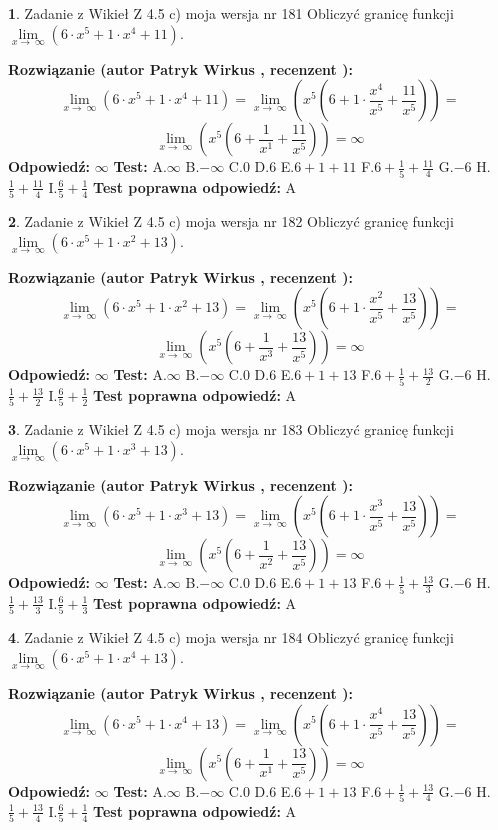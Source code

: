 \documentclass[12pt, a4paper]{article}
\theoremstyle{definition} %
\newtheorem{zad}{}
\newcommand{\zadStart}[1]{\begin{zad}#1\newline}
\newcommand{\zadStop}{\end{zad}}
\newcommand{\rozwStart}[2]{\noindent \textbf{Rozwiązanie (autor #1 , recenzent #2): }\newline}
\newcommand{\rozwStop}{\newline}
\newcommand{\odpStart}{\noindent \textbf{Odpowiedź:}\newline}
\newcommand{\odpStop}{\newline}
\newcommand{\testStart}{\noindent \textbf{Test:}\newline}
\newcommand{\testStop}{\newline}
\newcommand{\kluczStart}{\noindent \textbf{Test poprawna odpowiedź:}\newline}
\newcommand{\kluczStop}{\newline}
\begin{document}
\zadStart{Zadanie z Wikieł Z 4.5 c) moja wersja nr 181}
Obliczyć granicę funkcji  $\lim\limits_{x\to\ \infty}(6 \cdot x^{5}+1 \cdot x^{4}+11)$.
\zadStop
\rozwStart{Patryk Wirkus}{}
$$\lim\limits_{x\to\ \infty}(6 \cdot x^{5}+1 \cdot x^{4}+11) = \lim\limits_{x\to\ \infty}(x^{5}(6 +1 \cdot \frac{x^{4}}{x^{5}}+\frac{11}{x^{5}})) =$$ $$\lim\limits_{x\to\ \infty}(x^{5}(6 +\frac{1}{x^{1}}+\frac{11}{x^{5}})) =\infty$$
\rozwStop
\odpStart
$\infty$
\odpStop
\testStart
A.$\infty$ B.$-\infty$ C.$0$ D.$6$ E.$6 + 1 + 11$
F.$6+\frac{1}{5}+\frac{11}{4}$ G.$-6$
H.$\frac{1}{5}+\frac{11}{4}$
I.$\frac{6}{5}+\frac{1}{4}$
\testStop
\kluczStart
A
\kluczStop



\zadStart{Zadanie z Wikieł Z 4.5 c) moja wersja nr 182}
Obliczyć granicę funkcji  $\lim\limits_{x\to\ \infty}(6 \cdot x^{5}+1 \cdot x^{2}+13)$.
\zadStop
\rozwStart{Patryk Wirkus}{}
$$\lim\limits_{x\to\ \infty}(6 \cdot x^{5}+1 \cdot x^{2}+13) = \lim\limits_{x\to\ \infty}(x^{5}(6 +1 \cdot \frac{x^{2}}{x^{5}}+\frac{13}{x^{5}})) =$$ $$\lim\limits_{x\to\ \infty}(x^{5}(6 +\frac{1}{x^{3}}+\frac{13}{x^{5}})) =\infty$$
\rozwStop
\odpStart
$\infty$
\odpStop
\testStart
A.$\infty$ B.$-\infty$ C.$0$ D.$6$ E.$6 + 1 + 13$
F.$6+\frac{1}{5}+\frac{13}{2}$ G.$-6$
H.$\frac{1}{5}+\frac{13}{2}$
I.$\frac{6}{5}+\frac{1}{2}$
\testStop
\kluczStart
A
\kluczStop



\zadStart{Zadanie z Wikieł Z 4.5 c) moja wersja nr 183}
Obliczyć granicę funkcji  $\lim\limits_{x\to\ \infty}(6 \cdot x^{5}+1 \cdot x^{3}+13)$.
\zadStop
\rozwStart{Patryk Wirkus}{}
$$\lim\limits_{x\to\ \infty}(6 \cdot x^{5}+1 \cdot x^{3}+13) = \lim\limits_{x\to\ \infty}(x^{5}(6 +1 \cdot \frac{x^{3}}{x^{5}}+\frac{13}{x^{5}})) =$$ $$\lim\limits_{x\to\ \infty}(x^{5}(6 +\frac{1}{x^{2}}+\frac{13}{x^{5}})) =\infty$$
\rozwStop
\odpStart
$\infty$
\odpStop
\testStart
A.$\infty$ B.$-\infty$ C.$0$ D.$6$ E.$6 + 1 + 13$
F.$6+\frac{1}{5}+\frac{13}{3}$ G.$-6$
H.$\frac{1}{5}+\frac{13}{3}$
I.$\frac{6}{5}+\frac{1}{3}$
\testStop
\kluczStart
A
\kluczStop



\zadStart{Zadanie z Wikieł Z 4.5 c) moja wersja nr 184}
Obliczyć granicę funkcji  $\lim\limits_{x\to\ \infty}(6 \cdot x^{5}+1 \cdot x^{4}+13)$.
\zadStop
\rozwStart{Patryk Wirkus}{}
$$\lim\limits_{x\to\ \infty}(6 \cdot x^{5}+1 \cdot x^{4}+13) = \lim\limits_{x\to\ \infty}(x^{5}(6 +1 \cdot \frac{x^{4}}{x^{5}}+\frac{13}{x^{5}})) =$$ $$\lim\limits_{x\to\ \infty}(x^{5}(6 +\frac{1}{x^{1}}+\frac{13}{x^{5}})) =\infty$$
\rozwStop
\odpStart
$\infty$
\odpStop
\testStart
A.$\infty$ B.$-\infty$ C.$0$ D.$6$ E.$6 + 1 + 13$
F.$6+\frac{1}{5}+\frac{13}{4}$ G.$-6$
H.$\frac{1}{5}+\frac{13}{4}$
I.$\frac{6}{5}+\frac{1}{4}$
\testStop
\kluczStart
A
\kluczStop
\end{document}
